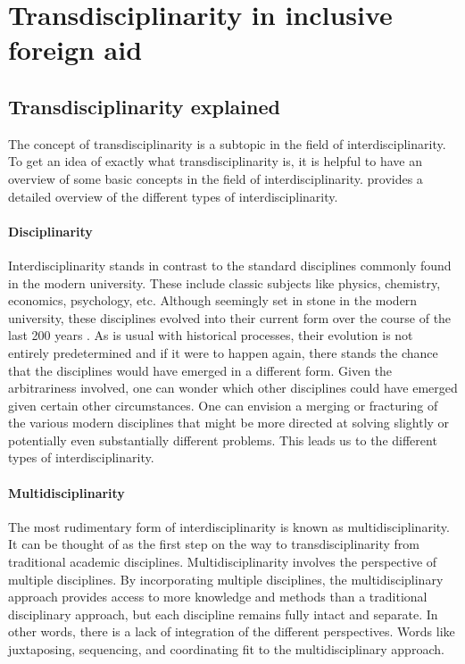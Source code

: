 \documentclass[a4paper]{article}
\begin{document}
\newpage

\section{Transdisciplinarity in inclusive foreign aid}

\subsection{Transdisciplinarity explained}

The concept of transdisciplinarity is a subtopic in the field of
interdisciplinarity. To get an idea of exactly what transdisciplinarity is, it
is helpful to have an overview of some basic concepts in the field of
interdisciplinarity. \cite{klein2010taxonomy} provides a detailed overview of
the different types of interdisciplinarity.

\paragraph{Disciplinarity}

Interdisciplinarity stands in contrast to the standard disciplines commonly
found in the modern university. These include classic subjects like physics,
chemistry, economics, psychology, etc. Although seemingly set in stone in the
modern university, these disciplines evolved into their current form over the
course of the last 200 years \cite{weingart2010short}. As is usual with
historical processes, their evolution is not entirely predetermined and if it
were to happen again, there stands the chance that the disciplines would have
emerged in a different form. Given the arbitrariness involved, one can wonder
which other disciplines could have emerged given certain other circumstances.
One can envision a merging or fracturing of the various modern disciplines
that might be more directed at solving slightly or potentially even
substantially different problems. This leads us to the different types of
interdisciplinarity.

\paragraph{Multidisciplinarity}

The most rudimentary form of interdisciplinarity is known as
multidisciplinarity. It can be thought of as the first step on the way to
transdisciplinarity from traditional academic disciplines.
Multidisciplinarity involves the perspective of multiple disciplines. By
incorporating multiple disciplines, the multidisciplinary approach provides
access to more knowledge and methods than a traditional disciplinary approach,
but each discipline remains fully intact and separate. In other words, there
is a lack of integration of the different perspectives. Words like
juxtaposing, sequencing, and coordinating fit to the multidisciplinary
approach. 
\end{document}
